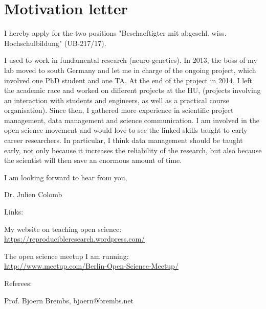 \section* {Motivation letter}

I hereby apply for the two positions "Beschaeftigter mit abgeschl. wiss. Hochschulbildung" (UB-217/17).%

I used to work in fundamental research (neuro-genetics). In 2013, the boss of my lab moved to south Germany and let me in charge of the ongoing project, which involved one PhD student and one TA. At the end of the project in 2014, I left the academic race and worked on different projects at the HU, (projects involving an interaction with students and engineers, as well as a practical course organisation).  Since then, I gathered more experience in scientific project management, data management and science communication. I am involved in the open science movement and would love to see the linked skills taught to early career researchers. In particular, I think data management should be taught early, not only because it increases the reliability of the research, but also because the scientist will then save an enormous amount of time.


I am looking forward to hear from you,

Dr. Julien Colomb

\vspace {1cm} 

Links:

My website on teaching open science: \\ \url{https://reproducibleresearch.wordpress.com/}

The open science meetup I am running:\\ \url{http://www.meetup.com/Berlin-Open-Science-Meetup/}



\vspace {0.5cm} 

Referees:

Prof. Bjoern Brembs, bjoern@brembs.net
